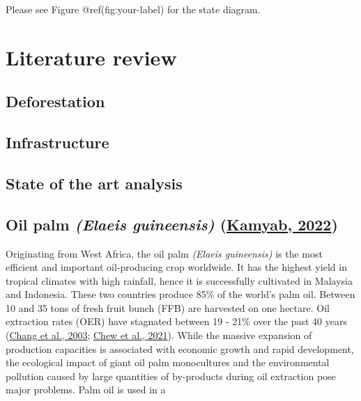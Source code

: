 \documentclass[
  letterpaper,
  DIV=11,
  numbers=noendperiod]{scrreprt}
\begin{document}
Please see Figure @ref(fig:your-label) for the state diagram.


\hypertarget{literature-review}{%
\chapter{Literature review}\label{literature-review}}

\hypertarget{deforestation}{%
\section{Deforestation}\label{deforestation}}

\hypertarget{infrastructure}{%
\section{Infrastructure}\label{infrastructure}}

\hypertarget{state-of-the-art-analysis}{%
\section{State of the art analysis}\label{state-of-the-art-analysis}}

\hypertarget{oil-palm-elaeis-guineensis-kamyabelaeisguineensis2022}{%
\section{\texorpdfstring{Oil palm \emph{(Elaeis guineensis)}
(\protect\hyperlink{ref-kamyabElaeisGuineensis2022}{Kamyab,
2022})}{Oil palm (Elaeis guineensis) (Kamyab, 2022)}}\label{oil-palm-elaeis-guineensis-kamyabelaeisguineensis2022}}

Originating from West Africa, the oil palm \emph{(Elaeis guineensis)} is
the most efficient and important oil-producing crop worldwide. It has
the highest yield in tropical climates with high rainfall, hence it is
successfully cultivated in Malaysia and Indonesia. These two countries
produce 85\% of the world's palm oil. Between 10 and 35 tons of fresh
fruit bunch (FFB) are harvested on one hectare. Oil extraction rates
(OER) have stagnated between 19 - 21\% over the past 40 years
(\protect\hyperlink{ref-changEconomicPerspectiveOil2003}{Chang et al.,
2003}; \protect\hyperlink{ref-chewImprovingSustainabilityPalm2021}{Chew
et al., 2021}). While the massive expansion of production capacities is
associated with economic growth and rapid development, the ecological
impact of giant oil palm monocultures and the environmental pollution
caused by large quantities of by-products during oil extraction pose
major problems. Palm oil is used in a
\end{document}
